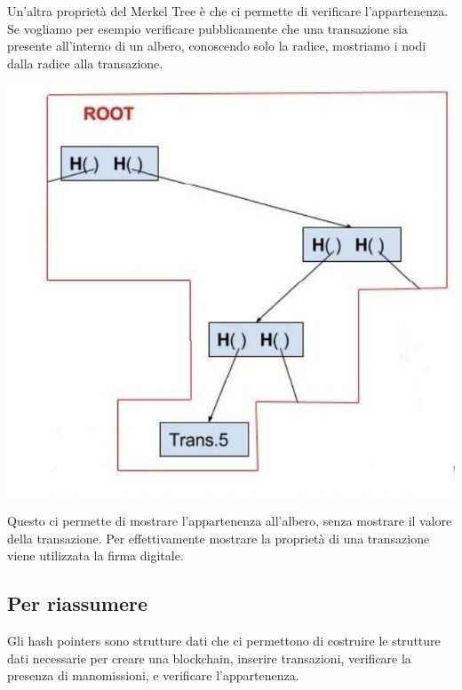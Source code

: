 \documentclass[11pt, oneside]{article}   	%
\begin{document}
Un'altra proprietà del Merkel Tree è che ci permette di verificare l'appartenenza. Se vogliamo per esempio verificare pubblicamente che una transazione sia presente all'interno di un albero, conoscendo solo la radice, mostriamo i nodi dalla radice alla transazione.
\begin{center}
\includegraphics[scale= 0.3]{5k}
\end{center}
Questo ci permette di mostrare l'appartenenza all'albero, senza mostrare il valore della transazione.
Per effettivamente mostrare la proprietà di una transazione viene utilizzata la firma digitale.\\

\subsection*{Per riassumere}
Gli hash pointers sono strutture dati che ci permettono di costruire le strutture dati necessarie per creare una blockchain, inserire transazioni, verificare la presenza di manomissioni, e verificare l'appartenenza.
\end{document}
